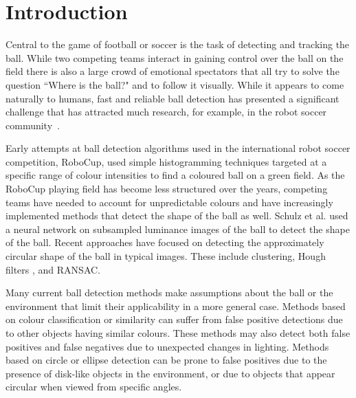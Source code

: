 \documentclass{sig-alternate-05-2015}
\newcommand{\citep}[1]{\cite{#1}}
\newcommand{\citet}[1]{\cite{#1}}
\begin{document}




	\section{Introduction} {
	\label{sec:intro}
Central to the game of football or soccer is the task of detecting and tracking the ball. While	two competing teams interact in gaining control over the ball on the field there is also a large crowd of emotional spectators that all try to solve the question ``Where is the ball?" and to follow it visually. While it appears to come naturally to humans, fast and reliable ball detection has presented a significant challenge that has attracted much research, for example, in the robot soccer community~\cite{KitanoEtAl1997}.





		Early attempts at ball detection algorithms used in the international robot soccer competition, RoboCup, used simple histogramming techniques targeted at a specific range of colour intensities to find a coloured ball on a green field. As the RoboCup playing field has become less structured over the years, competing teams have needed to account for unpredictable colours and have increasingly implemented methods that detect the shape of the ball as well. Schulz et al. \citet{schulz2007ball} used a neural network on subsampled luminance images of the ball to detect the shape of the ball. Recent approaches have focused on detecting the approximately circular shape of the ball in typical images. These include clustering, Hough filters \citep{li2013survey}, and RANSAC.%

		Many current ball detection methods make assumptions about the ball or the environment that limit their applicability in a more general case. Methods based on colour classification or similarity can suffer from false positive detections due to other objects having similar colours. These methods may also detect both false positives and false negatives due to unexpected changes in lighting. Methods based on circle or ellipse detection can be prone to false positives due to the presence of disk-like objects in the environment, or due to objects that appear circular when viewed from specific angles.

}
\end{document}
